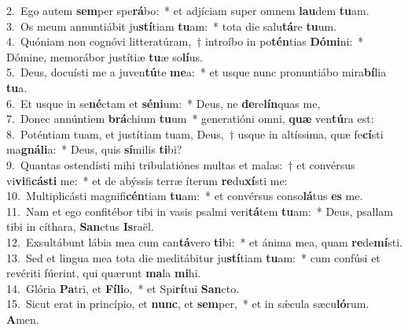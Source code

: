 {2.~}Ego autem \textbf{sem}per spe\textbf{rá}bo:~* et adjíciam super omnem \textbf{lau}dem \textbf{tu}am.\\
{3.~}Os meum annuntiábit ju\textbf{stí}tiam \textbf{tu}am:~* tota die salu\textbf{tá}re \textbf{tu}um.\\
{4.~}Quóniam non cognóvi litteratúram,~† introíbo in po\textbf{tén}tias \textbf{Dó}\textbf{mi}ni:~* Dómine, memorábor justítiæ \textbf{tu}æ so\textbf{lí}us.\\
{5.~}Deus, docuísti me a juven\textbf{tú}te \textbf{me}a:~* et usque nunc pronuntiábo mira\textbf{bí}lia \textbf{tu}a.\\
{6.~}Et usque in se\textbf{né}ctam et \textbf{sé}\textbf{ni}um:~* Deus, ne \textbf{de}re\textbf{lín}quas me,\\
{7.~}Donec annúntiem \textbf{brá}chium \textbf{tu}um~* generatióni omni, \textbf{quæ} ven\textbf{tú}ra est:\\
{8.~}Poténtiam tuam, et justítiam tuam, Deus,~† usque in altíssima, quæ fe\textbf{cí}sti ma\textbf{gná}\textbf{li}a:~* Deus, quis \textbf{sí}milis \textbf{ti}bi?\\
{9.~}Quantas ostendísti mihi tribulatiónes multas et malas:~† et convérsus vi\textbf{vi}fi\textbf{cá}\textbf{sti} me:~* et de abýssis terræ íterum \textbf{re}du\textbf{xí}sti me:\\
{10.~}Multiplicásti magnifi\textbf{cén}tiam \textbf{tu}am:~* et convérsus conso\textbf{lá}tus \textbf{es} me.\\
{11.~}Nam et ego confitébor tibi in vasis psalmi veri\textbf{tá}tem \textbf{tu}am:~* Deus, psallam tibi in cíthara, \textbf{San}ctus \textbf{Is}raël.\\
{12.~}Exsultábunt lábia mea cum can\textbf{tá}vero \textbf{ti}bi:~* et ánima mea, quam \textbf{re}de\textbf{mí}sti.\\
{13.~}Sed et lingua mea tota die meditábitur ju\textbf{stí}tiam \textbf{tu}am:~* cum confúsi et revériti fúerint, qui quærunt \textbf{ma}la \textbf{mi}hi.\\
{14.~}Glória \textbf{Pa}tri, et \textbf{Fí}\textbf{li}o,~* et Spi\textbf{rí}tui \textbf{San}cto.\\
{15.~}Sicut erat in princípio, et \textbf{nunc}, et \textbf{sem}per,~* et in sǽcula sæcu\textbf{ló}rum. \textbf{A}men.\\
